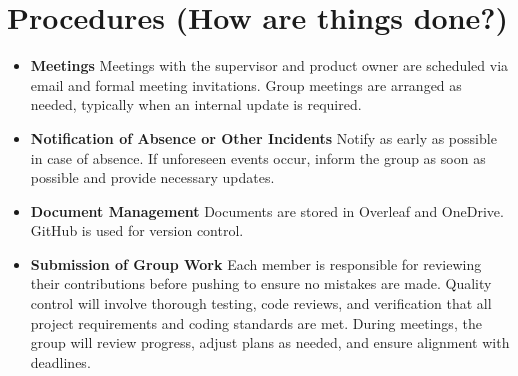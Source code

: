 \section*{Procedures (How are things done?)}
\begin{itemize}
    \setlength{\itemsep}{10pt} %
    \item \textbf{Meetings}  
    Meetings with the supervisor and product owner are scheduled via email and formal meeting invitations. Group meetings are arranged as needed, typically when an internal update is required.

    \item \textbf{Notification of Absence or Other Incidents}  
    Notify as early as possible in case of absence. If unforeseen events occur, inform the group as soon as possible and provide necessary updates.

    \item \textbf{Document Management}  
    Documents are stored in Overleaf and OneDrive. GitHub is used for version control.

    \item \textbf{Submission of Group Work}   
    Each member is responsible for reviewing their contributions before pushing to ensure no mistakes are made. Quality control will involve thorough testing, code reviews, and verification that all project requirements and coding standards are met. During meetings, the group will review progress, adjust plans as needed, and ensure alignment with deadlines.
    
\end{itemize}

